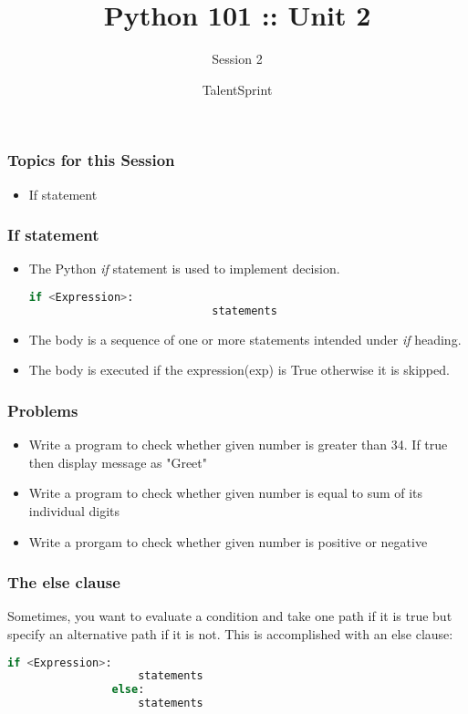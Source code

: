 \documentclass[14pt]{beamer}
\title{Python 101 :: Unit 2}
\subtitle{Session 2}
\date{}
\author[TS]{TalentSprint}
\begin{document}
    \begin{frame}
        \titlepage
    \end{frame}

    \begin{frame}
        \frametitle{Topics for this Session}
        \begin{itemize}
            \item If statement
        \end{itemize}
    \end{frame}
    \begin{frame}
        \frametitle{If statement}
        \begin{itemize}
            \item The Python \emph{if} statement is used to implement decision.
                \begin{block}{}
                    \begin{lstlisting}[language=Python]
                        if <Expression>:
                            statements
                    \end{lstlisting}
                \end{block}
            \item The body is a sequence of one or more statements intended under \emph{if} heading.
            \item The body is executed if the expression(exp) is True otherwise it is skipped.
        \end{itemize}
    \end{frame}
    \begin{frame}
        \frametitle{Problems}
        \begin{itemize}
            \item Write a program to check whether given number is greater than 34. If true then display message as "Greet" 
            \item Write a program to check whether given number is equal to sum of its individual digits
            \item Write a prorgam to check whether given number is positive or negative
        \end{itemize}
    \end{frame}
    \begin{frame}
        \frametitle{The else clause}
        Sometimes, you want to evaluate a condition and take one path if it is true but specify an alternative path if it is not. This is accomplished with an else clause:
        \begin{block}{}
            \begin{lstlisting}[language=Python]
                if <Expression>:
                    statements
                else:
                    statements
            \end{lstlisting}
        \end{block}
    \end{frame}
\end{document}

